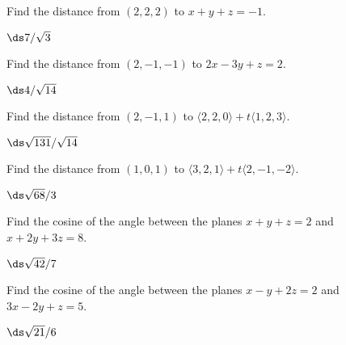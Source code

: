 \begin{exercises}
\begin{itemize}
\end{itemize}

\exercise Find the distance from $(2,2,2)$ to $x+y+z=-1$.
\begin{answer} $\ds 7/\sqrt3$
\end{answer}

\exercise Find the distance from $(2,-1,-1)$ to $2x-3y+z=2$.
\begin{answer} $\ds 4/\sqrt{14}$
\end{answer}

\exercise Find the distance from $(2,-1,1)$ to 
$\langle 2,2,0\rangle+t\langle 1,2,3\rangle$.
\begin{answer} $\ds \sqrt{131}/\sqrt{14}$
\end{answer}

\exercise Find the distance from $(1,0,1)$ to 
$\langle 3,2,1\rangle+t\langle 2,-1,-2\rangle$.
\begin{answer} $\ds \sqrt{68}/3$
\end{answer}

\exercise Find the cosine of the angle
between the planes $x+y+z=2$ and $x+2y+3z=8$.
\begin{answer} $\ds \sqrt{42}/7$
\end{answer}

\exercise Find the cosine of the angle
between the planes $x-y+2z=2$ and $3x-2y+z=5$.
\begin{answer} $\ds \sqrt{21}/6$
\end{answer}

\end{exercises}

